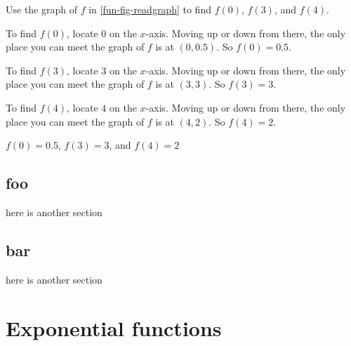 \begin{checkpoint}
\begin{problem}\label{}
Use the graph of $f$ in \cref{fun-fig-readgraph} to find $f(0)$, $f(3)$, and $f(4)$.
%
\begin{longsolution}
%
 To find $f(0)$, locate $0$ on the $x$-axis. Moving up or down from there, the only place you can meet the graph
					of $f$ is at $(0,0.5)$. So $f(0)=0.5$.
%
\par  To find $f(3)$, locate $3$ on the $x$-axis. Moving up or down from there, the only place you can meet the graph
                                        of $f$ is at $(3,3)$. So $f(3)=3$.
%
\par  To find $f(4)$, locate $4$ on the $x$-axis. Moving up or down from there, the only place you can meet the graph
                                        of $f$ is at $(4,2)$. So $f(4)=2$.
%

%
\end{longsolution}
%
\begin{shortsolution}
%
$f(0)=0.5$, $f(3)=3$, and $f(4)=2$
					
%
\end{shortsolution}
%
\end{problem}
%
\end{checkpoint}
%
\typeout{************************************************}
\typeout{************************************************}
%
\section{foo}\label{}
%
here is another section
%
\typeout{************************************************}
\typeout{************************************************}
%
\section{bar}\label{}
%
here is another section
%
\typeout{************************************************}
\typeout{************************************************}
%
\chapter{Exponential functions}\label{}
%
\begin{comment}
This file was created using ./xsl/omd2tex.xsl,
there is no point in editing it :)

This file is all about exponential functions.
\end{comment}

